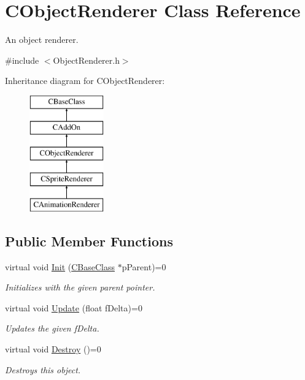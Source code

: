 \hypertarget{class_c_object_renderer}{}\section{C\+Object\+Renderer Class Reference}
\label{class_c_object_renderer}


An object renderer.  




{\ttfamily \#include $<$Object\+Renderer.\+h$>$}

Inheritance diagram for C\+Object\+Renderer\+:\begin{figure}[H]
\begin{center}
\leavevmode
\includegraphics[height=5.000000cm]{class_c_object_renderer}
\end{center}
\end{figure}
\subsection*{Public Member Functions}
\begin{DoxyCompactItemize}
\item 
virtual void \hyperlink{class_c_object_renderer_ae77ab5ea03b74e5cba97de1c4ffeafd2}{Init} (\hyperlink{class_c_base_class}{C\+Base\+Class} $\ast$p\+Parent)=0
\begin{DoxyCompactList}\small\item\em Initializes with the given parent pointer. \end{DoxyCompactList}\item 
virtual void \hyperlink{class_c_object_renderer_a0e987eef94e9a28c0d5e78b9a35627d8}{Update} (float f\+Delta)=0
\begin{DoxyCompactList}\small\item\em Updates the given f\+Delta. \end{DoxyCompactList}\item 
virtual void \hyperlink{class_c_object_renderer_ac2c4c45f3754474cafa250cb2a37ff4e}{Destroy} ()=0\hypertarget{class_c_object_renderer_ac2c4c45f3754474cafa250cb2a37ff4e}{}\label{class_c_object_renderer_ac2c4c45f3754474cafa250cb2a37ff4e}

\begin{DoxyCompactList}\small\item\em Destroys this object. \end{DoxyCompactList}\end{DoxyCompactItemize}
